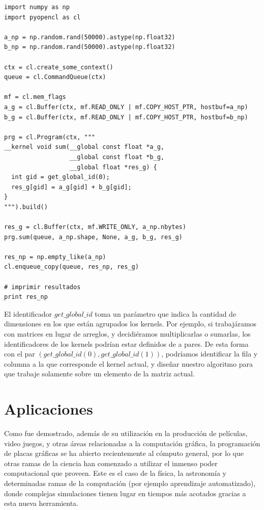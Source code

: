 \begin{verbatim}
import numpy as np
import pyopencl as cl

a_np = np.random.rand(50000).astype(np.float32)
b_np = np.random.rand(50000).astype(np.float32)

ctx = cl.create_some_context()
queue = cl.CommandQueue(ctx)

mf = cl.mem_flags
a_g = cl.Buffer(ctx, mf.READ_ONLY | mf.COPY_HOST_PTR, hostbuf=a_np)
b_g = cl.Buffer(ctx, mf.READ_ONLY | mf.COPY_HOST_PTR, hostbuf=b_np)

prg = cl.Program(ctx, """
__kernel void sum(__global const float *a_g,
                  __global const float *b_g,
                  __global float *res_g) {
  int gid = get_global_id(0);
  res_g[gid] = a_g[gid] + b_g[gid];
}
""").build()

res_g = cl.Buffer(ctx, mf.WRITE_ONLY, a_np.nbytes)
prg.sum(queue, a_np.shape, None, a_g, b_g, res_g)

res_np = np.empty_like(a_np)
cl.enqueue_copy(queue, res_np, res_g)

# imprimir resultados
print res_np
\end{verbatim}

El identificador $get\_global\_id$ toma un parámetro que indica la cantidad de dimensiones en los que están agrupados los kernels.
Por ejemplo, si trabajáramos con matrices en lugar de arreglos, y decidiéramos multiplicarlas o sumarlas, los identificadores de los kernels podrían estar definidos de a pares.
De esta forma con el par $(get\_global\_id(0), get\_global\_id(1))$, podríamos identificar la fila y columna a la que corresponde el kernel actual, y diseñar nuestro algoritmo para que trabaje solamente sobre un elemento de la matriz actual.


\section{Aplicaciones}
Como fue demostrado, además de su utilización en la producción de películas, video juegos, y otras áreas relacionadas a la computación gráfica, la programación de placas gráficas se ha abierto recientemente al cómputo general, por lo que otras ramas de la ciencia han comenzado a utilizar el inmenso poder computacional que proveen.
Este es el caso de la física, la astronomía y determinadas ramas de la computación (por ejemplo aprendizaje automatizado), donde complejas simulaciones tienen lugar en tiempos más acotados gracias a esta nueva herramienta.

